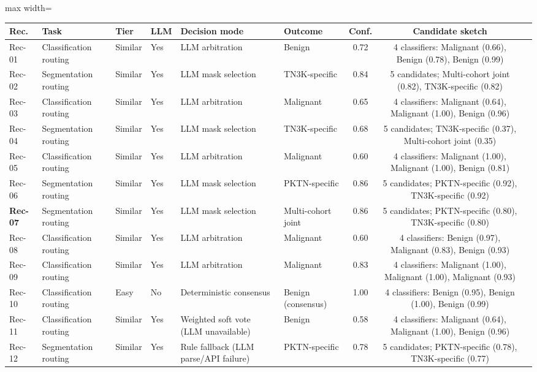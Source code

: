 \begin{responseinlinetable}
\label{tab_A1_audit_exemplars}
\begin{adjustbox}{max width=\textwidth}
\footnotesize
\begin{tabular}{llllllccp{}}
\toprule
\textbf{Rec.} & \textbf{Task} & \textbf{Tier} & \textbf{LLM} & \textbf{Decision mode} & \textbf{Outcome} & \textbf{Conf.} & \textbf{Candidate sketch} \\
\midrule
Rec-01 & Classification routing & Similar & Yes & LLM arbitration & Benign & 0.72 & 4 classifiers: Malignant (0.66), Benign (0.78), Benign (0.99) \\
Rec-02 & Segmentation routing & Similar & Yes & LLM mask selection & TN3K-specific & 0.84 & 5 candidates; Multi-cohort joint (0.82), TN3K-specific (0.82) \\
Rec-03 & Classification routing & Similar & Yes & LLM arbitration & Malignant & 0.65 & 4 classifiers: Malignant (0.64), Malignant (1.00), Benign (0.96) \\
Rec-04 & Segmentation routing & Similar & Yes & LLM mask selection & TN3K-specific & 0.68 & 5 candidates; TN3K-specific (0.37), Multi-cohort joint (0.35) \\
Rec-05 & Classification routing & Similar & Yes & LLM arbitration & Malignant & 0.60 & 4 classifiers: Malignant (1.00), Malignant (1.00), Benign (0.81) \\
Rec-06 & Segmentation routing & Similar & Yes & LLM mask selection & PKTN-specific & 0.86 & 5 candidates; PKTN-specific (0.92), TN3K-specific (0.92) \\
\textbf{Rec-07} & Segmentation routing & Similar & Yes & LLM mask selection & Multi-cohort joint & 0.86 & 5 candidates; PKTN-specific (0.80), TN3K-specific (0.80) \\
Rec-08 & Classification routing & Similar & Yes & LLM arbitration & Malignant & 0.60 & 4 classifiers: Benign (0.97), Malignant (0.83), Benign (0.93) \\
Rec-09 & Classification routing & Similar & Yes & LLM arbitration & Malignant & 0.83 & 4 classifiers: Malignant (1.00), Malignant (1.00), Malignant (0.93) \\
Rec-10 & Classification routing & Easy & No & Deterministic consensus & Benign (consensus) & 1.00 & 4 classifiers: Benign (0.95), Benign (1.00), Benign (0.99) \\
Rec-11 & Classification routing & Similar & Yes & Weighted soft vote (LLM unavailable) & Benign & 0.58 & 4 classifiers: Malignant (0.64), Malignant (1.00), Benign (0.96) \\
Rec-12 & Segmentation routing & Similar & Yes & Rule fallback (LLM parse/API failure) & PKTN-specific & 0.78 & 5 candidates; PKTN-specific (0.78), TN3K-specific (0.77) \\
\bottomrule
\end{tabular}
\end{adjustbox}
\end{responseinlinetable}
